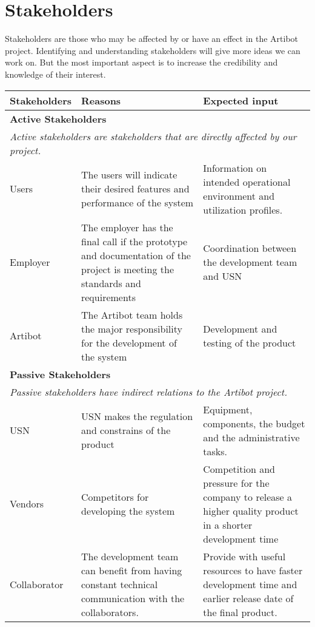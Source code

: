 \documentclass{article}
\begin{document}
\section{Stakeholders} 
Stakeholders are those who may be affected by or have an effect in the Artibot project. Identifying and understanding stakeholders will give more ideas we can work on. But the most important aspect is to increase the credibility and knowledge of their interest. 

\begin{table}[htbp]
\centering
    \begin{tabular}{ |p{2.5cm}|p{6.5cm}|p{6.5cm}| }
        \hline
            \textbf{Stakeholders} & \textbf{Reasons} & \textbf{Expected input} \\ \hline 
            \multicolumn{3}{|l|}{\textbf{Active Stakeholders}}\\
            \multicolumn{3}{|l|}{\hspace{4 mm}\textit{Active stakeholders are stakeholders that are directly affected by our project.}}  \\ 
        \hline 
            Users & The users will indicate their desired features and performance of the system & Information on intended operational environment and utilization profiles. \\ 
        \hline
            Employer & The employer has the final call if the prototype and documentation of the project is meeting the standards and requirements & Coordination between the development team and USN  \\ 
        \hline
            Artibot & The Artibot team holds the major responsibility for the development of the system & Development and testing of the product \\
        \hline
            \multicolumn{3}{|l|}{\textbf{Passive Stakeholders}}\\
            \multicolumn{3}{|l|}{\hspace{4 mm}\textit{Passive stakeholders have indirect relations to the Artibot project.}}  \\ 
        \hline 
            USN & USN makes the regulation and constrains of the product  & Equipment, components, the budget and the administrative tasks. \\
        \hline
        Vendors & Competitors for developing the system & Competition and pressure for the company to release a higher quality product in a shorter development time \\ 
        \hline
        Collaborator & The development team can benefit from having constant technical communication with the collaborators.  & Provide with useful resources to have faster development time and earlier release date of the final product.  \\ 
        \hline
    \end{tabular}
\end{table}
\end{document}
